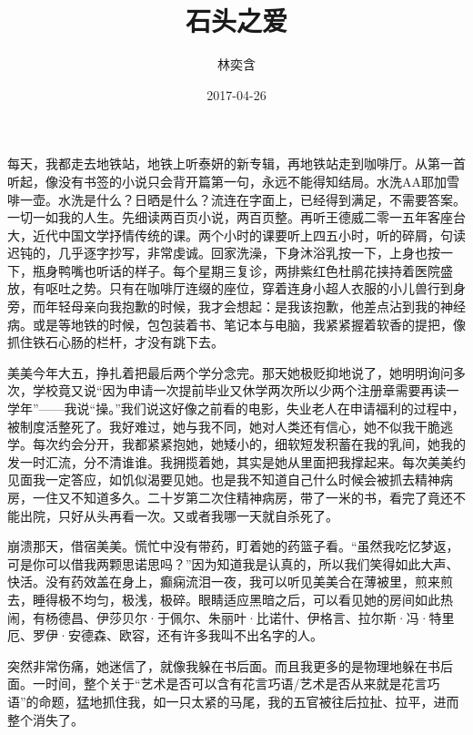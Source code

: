 \documentclass{article}
\title{石头之爱}
\author{林奕含}
\date{2017-04-26}
\begin{document}

\maketitle


\Large

﻿每天，我都走去地铁站，地铁上听泰妍的新专辑，再地铁站走到咖啡厅。从第一首听起，像没有书签的小说只会背开篇第一句，永远不能得知结局。水洗AA耶加雪啡一壶。水洗是什么？日晒是什么？流连在字面上，已经得到满足，不需要答案。一切一如我的人生。先细读两百页小说，两百页整。再听王德威二零一五年客座台大，近代中国文学抒情传统的课。两个小时的课要听上四五小时，听的碎屑，句读迟钝的，几乎逐字抄写，非常虔诚。回家洗澡，下身沐浴乳按一下，上身也按一下，瓶身鸭嘴也听话的样子。每个星期三复诊，两排紫红色杜鹃花挟持着医院盛放，有呕吐之势。只有在咖啡厅连缀的座位，穿着连身小超人衣服的小儿兽行到身旁，而年轻母亲向我抱歉的时候，我才会想起：是我该抱歉，他差点沾到我的神经病。或是等地铁的时候，包包装着书、笔记本与电脑，我紧紧握着软香的提把，像抓住铁石心肠的栏杆，才没有跳下去。

\newpage 



美美今年大五，挣扎着把最后两个学分念完。那天她极贬抑地说了，她明明询问多次，学校竟又说“因为申请一次提前毕业又休学两次所以少两个注册章需要再读一学年”——我说“操。”我们说这好像之前看的电影，失业老人在申请福利的过程中，被制度活整死了。我好难过，她与我不同，她对人类还有信心，她不似我干脆逃学。每次约会分开，我都紧紧抱她，她矮小的，细软短发积蓄在我的乳间，她我的发一时汇流，分不清谁谁。我拥揽着她，其实是她从里面把我撑起来。每次美美约见面我一定答应，如饥似渴要见她。也是我不知道自己什么时候会被抓去精神病房，一住又不知道多久。二十岁第二次住精神病房，带了一米的书，看完了竟还不能出院，只好从头再看一次。又或者我哪一天就自杀死了。

崩溃那天，借宿美美。慌忙中没有带药，盯着她的药篮子看。“虽然我吃忆梦返，可是你可以借我两颗思诺思吗？”因为知道我是认真的，所以我们笑得如此大声、快活。没有药效盖在身上，癫痫流泪一夜，我可以听见美美合在薄被里，煎来煎去，睡得极不均匀，极浅，极碎。眼睛适应黑暗之后，可以看见她的房间如此热闹，有杨德昌、伊莎贝尔·于佩尔、朱丽叶·比诺什、伊格言、拉尔斯·冯·特里厄、罗伊·安德森、欧容，还有许多我叫不出名字的人。

\newpage 

突然非常伤痛，她迷信了，就像我躲在书后面。而且我更多的是物理地躲在书后面。一时间，整个关于“艺术是否可以含有花言巧语/艺术是否从来就是花言巧语”的命题，猛地抓住我，如一只太紧的马尾，我的五官被往后拉扯、拉平，进而整个消失了。
\end{document}
